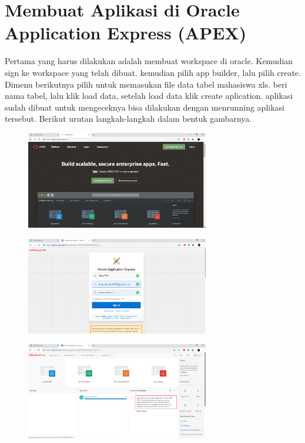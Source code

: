 \chapter{Membuat Aplikasi di Oracle Application Express (APEX)}

Pertama yang harus dilakukan adalah membuat workspace di oracle. Kemudian sign ke workspace yang telah dibuat. kemudian pilih app builder, lalu pilih create. Dimenu berikutnya pilih untuk memasukan file data tabel mahasiswa xls. beri nama tabel, lalu klik load data, setelah load data klik create aplication. aplikasi sudah dibuat untuk mengeceknya bisa dilakukan dengan menrunning aplikasi tersebut. Berikut urutan langkah-langkah dalam bentuk gambarnya.\\

\begin{figure}[H]
	\centering
	\includegraphics[width=8cm]{figures/1.png}
\end{figure}

\begin{figure}[H]
	\centering
	\includegraphics[width=8cm]{figures/2.png}
\end{figure}

\begin{figure}[H]
	\centering
	\includegraphics[width=8cm]{figures/3.png}
\end{figure}

